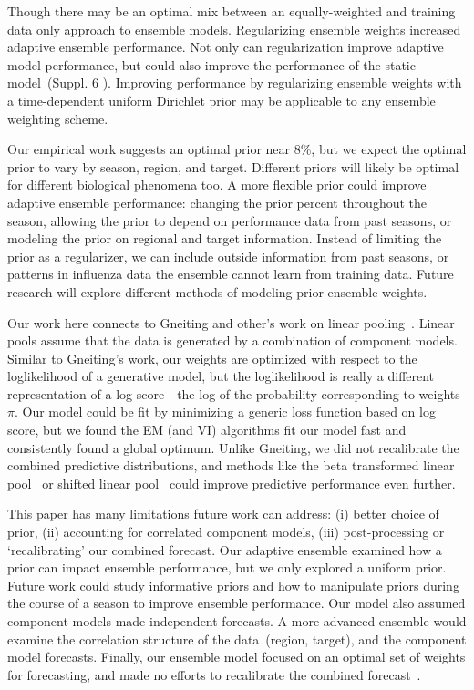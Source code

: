 \documentclass[sagev,times,Review,10pt]{sagej}
\begin{document}
Though there may be an optimal mix between an equally-weighted and training data only approach to ensemble models.
Regularizing ensemble weights increased adaptive ensemble performance.
Not only can regularization improve adaptive model performance, but could also improve the performance of the static model~(Suppl. 6%
).
Improving performance by regularizing ensemble weights with a time-dependent uniform Dirichlet prior may be applicable to any ensemble weighting scheme. 

Our empirical work suggests an optimal prior near 8\%, but we expect the optimal prior to vary by season, region, and target.
Different priors will likely be optimal for different biological phenomena too.
%
A more flexible prior could improve adaptive ensemble performance:
changing the prior percent throughout the season, allowing the prior to depend on performance data from past seasons, or modeling the prior on regional and target information.
Instead of limiting the prior as a regularizer, we can include outside information from past seasons, or patterns in influenza data the ensemble cannot learn from training data.
Future research will explore different methods of modeling prior ensemble weights.

Our work here connects to Gneiting and other's work on linear pooling~\citep{ranjan2010combining,gneiting2013combining,geweke2011optimal,wallis2011combining}.
Linear pools assume that the data is generated by a combination of component models.
Similar to Gneiting's work, our weights are optimized with respect to the loglikelihood of a generative model, but the loglikelihood is really a different representation of a log score---the log of the probability corresponding to weights $\pi$.
Our model could be fit by minimizing a generic loss function based on log score, but we found the EM (and VI) algorithms fit our model fast and consistently found a global optimum. 
Unlike Gneiting, we did not recalibrate the combined predictive distributions, and methods like the beta transformed linear pool~\citep{ranjan2010combining} or shifted linear pool~\citep{kleiber2011locally} could improve predictive performance even further.

This paper has many limitations future work can address: (i) better choice of prior, (ii) accounting for correlated component models, (iii) post-processing or `recalibrating' our combined forecast.
Our adaptive ensemble examined how a prior can impact ensemble performance, but we only explored a uniform prior.
Future work could study informative priors and how to manipulate priors during the course of a season to improve ensemble performance.
Our model also assumed component models made independent forecasts.
A more advanced ensemble would examine the correlation structure of the data~(region, target), and the component model forecasts.
Finally, our ensemble model focused on an optimal set of weights for forecasting, and made no efforts to recalibrate the combined forecast~\citep{gneiting2013combining}.
\end{document}
